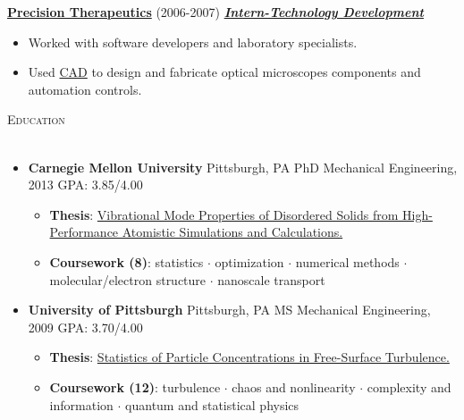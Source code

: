 \documentclass{article}
\newcommand{\area}[2]{\vspace*{-9pt} \begin{verse}\textbf{#1}   #2 \end{verse}  }
\newcommand{\lineunder}{\vspace*{-8pt} \\ \hspace*{-18pt} \hrulefill \\}
\newcommand{\header}[1]{{\hspace*{-15pt}\vspace*{6pt} \textsc{#1}} \vspace*{-6pt} \lineunder}
\newcommand{\employer}[3]{{ \textbf{#1} (#2) \underline{\textbf{\emph{#3}}}\\  }}
\newenvironment{achievements}{\begin{list}{$\bullet$}{\topsep 0pt \itemsep -2pt}}{\vspace*{4pt}\end{list}}
\newcommand{\schoolwithcourses}[3]{
 \textbf{#1} #2 $\bullet$ #3\\ 
\vspace*{5pt}
}
\begin{document}
\employer{\href{http://www.precisiontherapeutics.com/}{Precision Therapeutics}}{2006-2007}{Intern-Technology Development}
  \begin{itemize}
    \item Worked with software developers and laboratory specialists.
    \item Used \href{http://en.wikipedia.org/wiki/Computer-aided_design}{CAD} to design and fabricate optical microscopes components and automation controls. 
  \end{itemize}

\header{\large{Education}}

\begin{itemize}[leftmargin=*]
  \item \textbf{Carnegie Mellon University} Pittsburgh, PA PhD Mechanical Engineering, 2013 GPA: 3.85/4.00
  \begin{itemize}
    \item \textbf{Thesis}: \href{http://jasonlarkin.github.io/projects-phd.html}
    {Vibrational Mode Properties of Disordered Solids from High-Performance Atomistic Simulations and Calculations.}
    \item \textbf{Coursework (8)}: statistics $\cdot$ optimization $\cdot$ numerical methods $\cdot$ molecular/electron structure $\cdot$ nanoscale transport  
  \end{itemize}

  \item \textbf{University of Pittsburgh} Pittsburgh, PA MS Mechanical Engineering, 2009 GPA: 3.70/4.00
  \begin{itemize}
    \item \textbf{Thesis}: \href{http://jasonlarkin.github.io/projects-ms.html}{Statistics of Particle Concentrations in Free-Surface Turbulence.} 

    \item \textbf{Coursework (12)}: turbulence $\cdot$ chaos and nonlinearity $\cdot$ complexity and information $\cdot$ quantum and statistical physics 
  \end{itemize}


\end{itemize}
\end{document}
